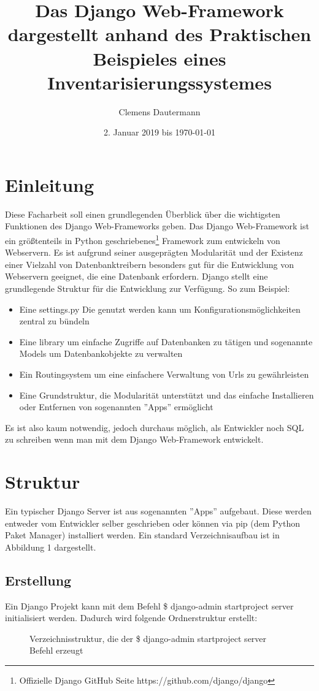\documentclass{article}
\title{Das Django Web-Framework dargestellt anhand des Praktischen Beispieles eines Inventarisierungssystemes}
\author{Clemens Dautermann}
\date{2. Januar 2019 bis \today}
\begin{document}
\maketitle
\newpage
\tableofcontents
\newpage


\section{Einleitung}
Diese Facharbeit soll einen grundlegenden Überblick über die wichtigsten Funktionen des Django Web-Frameworks geben.\newline
Das Django Web-Framework ist ein größtenteils in Python geschriebenes\footnote{Offizielle Django GitHub Seite https://github.com/django/django} Framework
zum entwickeln von Webservern. Es ist aufgrund seiner ausgeprägten Modularität und der Existenz einer Vielzahl von Datenbanktreibern besonders gut für
die Entwicklung von Webservern geeignet, die eine Datenbank erfordern.\newline 
Django stellt eine grundlegende Struktur für die Entwicklung zur Verfügung. So zum Beispiel:
\begin{itemize}
	\item Eine settings.py Die genutzt werden kann um Konfigurationsmöglichkeiten zentral zu bündeln
	\item Eine library um einfache Zugriffe auf Datenbanken zu tätigen und sogenannte Models um Datenbankobjekte zu verwalten
	\item Ein Routingsystem um eine einfachere Verwaltung von Urls zu gewährleisten
	\item Eine Grundstruktur, die Modularität unterstützt und das einfache Installieren oder Entfernen von sogenannten ''Apps'' ermöglicht
\end{itemize}
Es ist also kaum notwendig, jedoch durchaus möglich, als Entwickler noch SQL zu schreiben wenn man mit dem Django Web-Framework entwickelt.

\section{Struktur}
Ein typischer Django Server ist aus sogenannten ''Apps'' aufgebaut. Diese werden entweder vom Entwickler selber geschrieben oder können via pip (dem Python Paket Manager) installiert werden. Ein standard Verzeichnisaufbau ist in Abbildung 1 dargestellt.
\subsection{Erstellung}
Ein Django Projekt kann mit dem Befehl \$ django-admin startproject server initialisiert werden. Dadurch wird folgende Ordnerstruktur erstellt:
\begin{figure}[H]
\caption{Verzeichnisstruktur, die der \$ django-admin startproject server Befehl erzeugt}
\end{figure}
\end{document}
